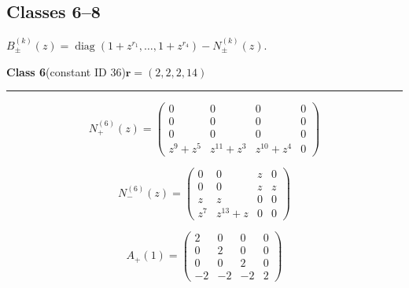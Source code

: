 \subsection*{Classes 6--8}
\noindent $B_\pm^{(k)}(z)=\operatorname{diag}(1+z^{r_1},\ldots,1+z^{r_4})-N_\pm^{(k)}(z)$.\par\medskip
\noindent\begin{minipage}{\linewidth}
\noindent\textbf{Class 6}\quad\small (constant ID 36)\hfill $\symbf{r}=(2,2,2,14)$
\par\smallskip\noindent\textcolor{rulegray}{\rule{\linewidth}{0.3pt}}
\begin{minipage}[c]{0.495\linewidth}\centering\fontsize{9.7}{12}\selectfont
\setlength{\abovedisplayskip}{4pt}\setlength{\belowdisplayskip}{4pt}
\setlength{\abovedisplayshortskip}{4pt}\setlength{\belowdisplayshortskip}{4pt}
\setlength{\arraycolsep}{3pt}\renewcommand{\arraystretch}{1.08}
\[N_{+}^{(6)}(z)=\begin{pmatrix}0 & 0 & 0 & 0\\0 & 0 & 0 & 0\\0 & 0 & 0 & 0\\z^{9} + z^{5} & z^{11} + z^{3} & z^{10} + z^{4} & 0\end{pmatrix}\]
\end{minipage}%
\begin{minipage}[c]{0.495\linewidth}\centering\fontsize{9.7}{12}\selectfont
\setlength{\abovedisplayskip}{4pt}\setlength{\belowdisplayskip}{4pt}
\setlength{\abovedisplayshortskip}{4pt}\setlength{\belowdisplayshortskip}{4pt}
\setlength{\arraycolsep}{3pt}\renewcommand{\arraystretch}{1.08}
\[N_{-}^{(6)}(z)=\begin{pmatrix}0 & 0 & z & 0\\0 & 0 & z & z\\z & z & 0 & 0\\z^{7} & z^{13} + z & 0 & 0\end{pmatrix}\]
\end{minipage}%
\par\noindent
\begin{minipage}[c]{0.495\linewidth}\centering\fontsize{9.7}{12}\selectfont
\setlength{\abovedisplayskip}{4pt}\setlength{\belowdisplayskip}{4pt}
\setlength{\abovedisplayshortskip}{4pt}\setlength{\belowdisplayshortskip}{4pt}
\setlength{\arraycolsep}{3pt}\renewcommand{\arraystretch}{1.08}
\[A_{+}(1)=\begin{pmatrix}2 & 0 & 0 & 0\\0 & 2 & 0 & 0\\0 & 0 & 2 & 0\\-2 & -2 & -2 & 2\end{pmatrix}\]

\end{minipage}
\end{minipage}
